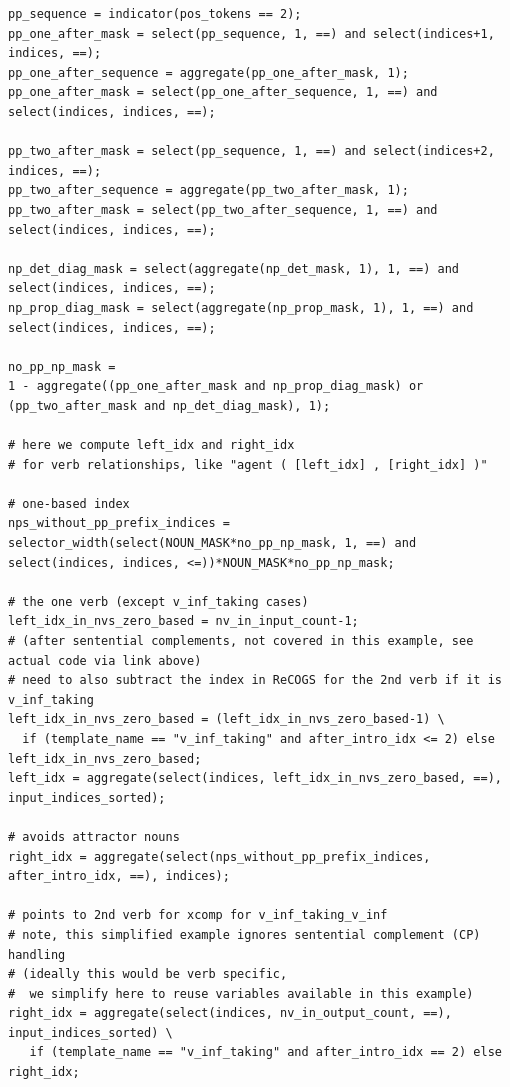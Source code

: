 \documentclass[11pt]{article}
\begin{document}
\begin{tiny}
\begin{verbatim}
pp_sequence = indicator(pos_tokens == 2);
pp_one_after_mask = select(pp_sequence, 1, ==) and select(indices+1, indices, ==);
pp_one_after_sequence = aggregate(pp_one_after_mask, 1);
pp_one_after_mask = select(pp_one_after_sequence, 1, ==) and select(indices, indices, ==);

pp_two_after_mask = select(pp_sequence, 1, ==) and select(indices+2, indices, ==);
pp_two_after_sequence = aggregate(pp_two_after_mask, 1);
pp_two_after_mask = select(pp_two_after_sequence, 1, ==) and select(indices, indices, ==);

np_det_diag_mask = select(aggregate(np_det_mask, 1), 1, ==) and select(indices, indices, ==);
np_prop_diag_mask = select(aggregate(np_prop_mask, 1), 1, ==) and select(indices, indices, ==);

no_pp_np_mask = 
1 - aggregate((pp_one_after_mask and np_prop_diag_mask) or 
(pp_two_after_mask and np_det_diag_mask), 1);

# here we compute left_idx and right_idx
# for verb relationships, like "agent ( [left_idx] , [right_idx] )"

# one-based index
nps_without_pp_prefix_indices = 
selector_width(select(NOUN_MASK*no_pp_np_mask, 1, ==) and
select(indices, indices, <=))*NOUN_MASK*no_pp_np_mask;

# the one verb (except v_inf_taking cases)
left_idx_in_nvs_zero_based = nv_in_input_count-1;
# (after sentential complements, not covered in this example, see actual code via link above)
# need to also subtract the index in ReCOGS for the 2nd verb if it is v_inf_taking
left_idx_in_nvs_zero_based = (left_idx_in_nvs_zero_based-1) \
  if (template_name == "v_inf_taking" and after_intro_idx <= 2) else left_idx_in_nvs_zero_based;
left_idx = aggregate(select(indices, left_idx_in_nvs_zero_based, ==), input_indices_sorted);

# avoids attractor nouns
right_idx = aggregate(select(nps_without_pp_prefix_indices, after_intro_idx, ==), indices);

# points to 2nd verb for xcomp for v_inf_taking_v_inf
# note, this simplified example ignores sentential complement (CP) handling
# (ideally this would be verb specific,
#  we simplify here to reuse variables available in this example)
right_idx = aggregate(select(indices, nv_in_output_count, ==), input_indices_sorted) \
   if (template_name == "v_inf_taking" and after_intro_idx == 2) else right_idx;


\end{verbatim}
\end{tiny}
\end{document}
